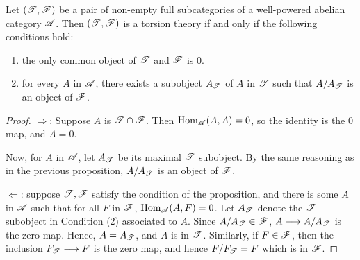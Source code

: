 \begin{prop}\label{prop_tt_suff_cond}
Let $(\mathscr{T}, \mathscr{F})$ be a pair of non-empty full subcategories
of a well-powered abelian category $\mathscr{A}$. Then $(\mathscr{T}, 
\mathscr{F})$ is a torsion theory if and only if the following 
conditions hold:
\begin{enumerate}
\item the only common object of $\mathscr{T}$ and $\mathscr{F}$ is 0.

\item for every $A$ in $\mathscr{A}$, there exists a subobject 
$A_{\mathscr{T}}$ of $A$ in $\mathscr{T}$ such that $A/A_{\mathscr{T}}$ 
is an object of $\mathscr{F}$.
\end{enumerate}
\end{prop}
\begin{proof}
\noindent $\Rightarrow$: Suppose $A$ is $\mathscr{T} \cap \mathscr{F}$.
Then $\mathrm{Hom}_{\mathscr{A}}(A,A) = 0$, so the identity is the 0 map, and
$A = 0$.

Now, for $A$ in $\mathscr{A}$, let $A_{\mathscr{T}}$ be its maximal
$\mathscr{T}$ subobject. By the same reasoning as in the previous
proposition, $A/A_{\mathscr{T}}$ is an object of $\mathscr{F}$.

\vskip 10pt
\noindent $\Leftarrow$: suppose $\mathscr{T}, \mathscr{F}$ satisfy the 
condition of the proposition, and there is some $A$ in $\mathscr{A}$ 
such that for all $F$ in $\mathscr{F}$, $\mathrm{Hom}_{\mathscr{A}}(A, F) = 0$. Let
$A_{\mathscr{T}}$ denote the $\mathscr{T}$-subobject in Condition (2) 
associated to $A$. Since $A/A_{\mathscr{T}} \in \mathscr{F}$, $A \longrightarrow 
A/A_{\mathscr{T}}$ is the zero map. Hence, $A = A_{\mathscr{T}}$, and
$A$ is in $\mathscr{T}$. Similarly, if $F \in \mathscr{F}$, then the 
inclusion $F_{\mathscr{T}} \longrightarrow F$ is the zero map, and hence 
$F/F_{\mathscr{T}} = F$ which is in $\mathscr{F}$.
\end{proof}

